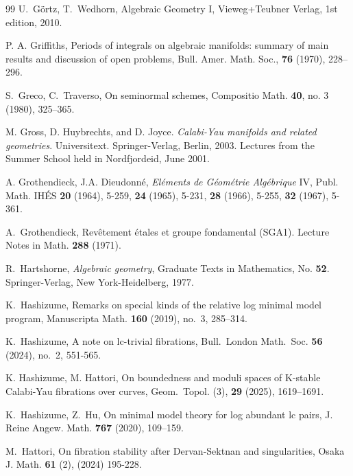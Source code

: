 \documentclass[12pt,twoside]{amsart}
\theoremstyle{definition}
\begin{document}
\begin{thebibliography}{99}
U.~G\"{o}rtz, T.~Wedhorn, Algebraic Geometry I, Vieweg+Teubner Verlag, 1st edition, 2010. 

P. A. Griffiths, Periods of integrals on algebraic manifolds: summary of main results and discussion of open problems, Bull. Amer. Math. Soc., {\bf76} (1970), 228–296.

S.~Greco,
C.~Traverso,
On seminormal schemes,
Compositio Math. {\bf40}, no. 3 (1980), 325--365.

 M. Gross, D. Huybrechts, and D. Joyce. {\it Calabi-Yau manifolds and related geometries}. Universitext. Springer-Verlag, Berlin, 2003. Lectures from the Summer School held in Nordfjordeid, June 2001.



 A. Grothendieck, J.A. Dieudonn\'{e}, {\it El\'{e}ments de G\'{e}om\'{e}trie Alg\'{e}brique} IV,
Publ. Math. IH\'{E}S {\bf20} (1964), 5-259, {\bf24} (1965), 5-231, {\bf 28} (1966), 5-255, {\bf 32} (1967), 5-361.

 A.~Grothendieck, Rev\^etement \'etales et groupe fondamental (SGA1). Lecture Notes in Math. {\bf288} (1971).





 R.~Hartshorne, {\em{Algebraic geometry}}, Graduate Texts in Mathematics, No. {\textbf{52}}. Springer-Verlag, New York-Heidelberg, 1977.


 K.~Hashizume, Remarks on special kinds of the relative log minimal model program, Manuscripta Math. {\textbf{160}} (2019), no.~3, 285--314. 


 K.~Hashizume, A note on lc-trivial fibrations, Bull.~London Math.~Soc. {\bf56} (2024), no.~2, 551-565. 

 K. Hashizume, M. Hattori, On boundedness and moduli spaces of K-stable Calabi-Yau fibrations over curves, Geom.~Topol. (3), {\bf29} (2025), 1619--1691.


 K.~Hashizume, Z.~Hu, On minimal model theory for log abundant lc pairs, J. Reine Angew. Math.  {\textbf{767}} (2020), 109--159.





 M.~Hattori, On fibration stability after Dervan-Sektnan and singularities, Osaka J. Math. {\bf61} (2), (2024) 195-228. 


\end{thebibliography}
\end{document}
